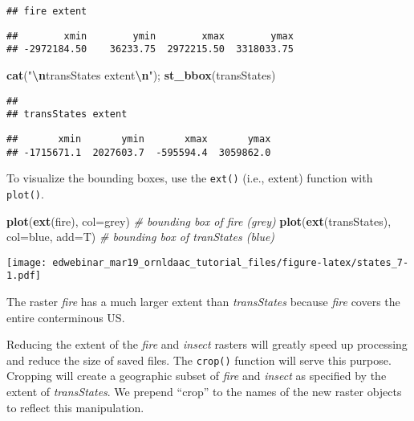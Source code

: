 \documentclass[
]{article}
\newenvironment{Shaded}{\begin{snugshade}}{\end{snugshade}}
\newcommand{\AttributeTok}[1]{\textcolor[rgb]{0.13,0.29,0.53}{#1}}
\newcommand{\CommentTok}[1]{\textcolor[rgb]{0.56,0.35,0.01}{\textit{#1}}}
\newcommand{\FunctionTok}[1]{\textcolor[rgb]{0.13,0.29,0.53}{\textbf{#1}}}
\newcommand{\NormalTok}[1]{#1}
\newcommand{\SpecialCharTok}[1]{\textcolor[rgb]{0.81,0.36,0.00}{\textbf{#1}}}
\newcommand{\StringTok}[1]{\textcolor[rgb]{0.31,0.60,0.02}{#1}}
\begin{document}
\begin{verbatim}
## fire extent
\end{verbatim}

\begin{verbatim}
##        xmin        ymin        xmax        ymax 
## -2972184.50    36233.75  2972215.50  3318033.75
\end{verbatim}

\begin{Shaded}
\begin{Highlighting}[]
\FunctionTok{cat}\NormalTok{(}\StringTok{"}\SpecialCharTok{\textbackslash{}n}\StringTok{transStates extent}\SpecialCharTok{\textbackslash{}n}\StringTok{"}\NormalTok{); }\FunctionTok{st\_bbox}\NormalTok{(transStates)}
\end{Highlighting}
\end{Shaded}

\begin{verbatim}
## 
## transStates extent
\end{verbatim}

\begin{verbatim}
##       xmin       ymin       xmax       ymax 
## -1715671.1  2027603.7  -595594.4  3059862.0
\end{verbatim}

To visualize the bounding boxes, use the \texttt{ext()} (i.e., extent)
function with \texttt{plot()}.

\begin{Shaded}
\begin{Highlighting}[]
\FunctionTok{plot}\NormalTok{(}\FunctionTok{ext}\NormalTok{(fire), }\AttributeTok{col=}\StringTok{\textquotesingle{}grey\textquotesingle{}}\NormalTok{)  }\CommentTok{\# bounding box of fire (grey)}
\FunctionTok{plot}\NormalTok{(}\FunctionTok{ext}\NormalTok{(transStates), }\AttributeTok{col=}\StringTok{\textquotesingle{}blue\textquotesingle{}}\NormalTok{, }\AttributeTok{add=}\NormalTok{T)  }\CommentTok{\# bounding box of tranStates (blue)}
\end{Highlighting}
\end{Shaded}

\texttt{[image: edwebinar\_mar19\_ornldaac\_tutorial\_files/figure-latex/states\_7-1.pdf]}

The raster \emph{fire} has a much larger extent than \emph{transStates}
because \emph{fire} covers the entire conterminous US.

Reducing the extent of the \emph{fire} and \emph{insect} rasters will
greatly speed up processing and reduce the size of saved files. The
\texttt{crop()} function will serve this purpose. Cropping will create a
geographic subset of \emph{fire} and \emph{insect} as specified by the
extent of \emph{transStates}. We prepend ``crop'' to the names of the
new raster objects to reflect this manipulation.
\end{document}
